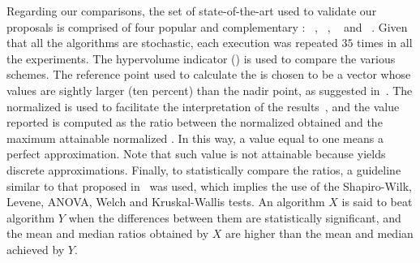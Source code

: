 Regarding our comparisons, the set of state-of-the-art \MOEAS{} used to validate our proposals is comprised of four 
popular and complementary \MOEAS{}: \NSGAII{}~\cite{deb2002fast}, \MOEADDE{}~\cite{zhang2009performance}, \RMOEA{}~\cite{trautmann2013r2} 
and \NSGAIII{}~\cite{deb2013evolutionary}.
%
%
%
Given that all the algorithms are stochastic, each execution was repeated $35$ times in all the experiments.
%
The hypervolume indicator (\HV{}) is used to compare the various schemes.
%
The reference point used to calculate the \HV{} is chosen to be a vector whose values are sightly larger (ten percent) 
than the nadir point, as suggested in~\cite{ishibuchi2017reference}.
%
The normalized \HV{} is used to facilitate the interpretation of the results~\cite{li2014evolutionary}, 
and the value reported is computed as the ratio between the normalized \HV{} obtained and the maximum attainable normalized \HV{}.
%
In this way, a value equal to one means a perfect approximation.
%
Note that such value is not attainable because \MOEAS{} yields discrete approximations.
%
Finally, to statistically compare the \HV{} ratios, a guideline similar to that proposed in~\cite{durillo2010study} was used, 
which implies the use of the Shapiro-Wilk, Levene, ANOVA, Welch and Kruskal-Wallis tests.
%
An algorithm $X$ is said to beat algorithm $Y$ when the differences between them are statistically significant, 
and the mean and median \HV{} ratios obtained by $X$ are higher than the mean and median achieved by $Y$.

%
%
%
%
%

